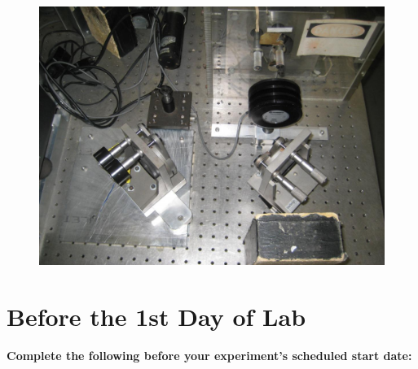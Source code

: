 \documentclass{../lab}
\begin{document}
\begin{figure}[h]
    \centering
    \href{http://experimentationlab.berkeley.edu/sites/default/files/CO-2/CO2_Optics_3567_0.JPG}{\includegraphics[width=\linewidth]{images/CO2_Optics_3567_0.JPG}}
    \caption{}
    \label{fig:CO2_Optics_3567_0}
\end{figure}

\section{Before the 1st Day of Lab}

\textbf{Complete the following before your experiment's scheduled start date:}
\end{document}
